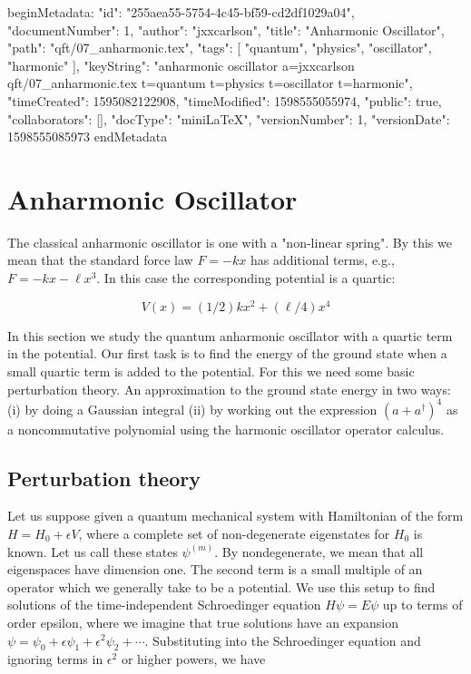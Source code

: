 beginMetadata:
{
    "id": "255aea55-5754-4c45-bf59-cd2df1029a04",
    "documentNumber": 1,
    "author": "jxxcarlson",
    "title": "Anharmonic Oscillator",
    "path": "qft/07_anharmonic.tex",
    "tags": [
        "quantum",
        "physics",
        "oscillator",
        "harmonic"
    ],
    "keyString": "anharmonic oscillator a=jxxcarlson qft/07_anharmonic.tex t=quantum t=physics t=oscillator t=harmonic",
    "timeCreated": 1595082122908,
    "timeModified": 1598555055974,
    "public": true,
    "collaborators": [],
    "docType": "miniLaTeX",
    "versionNumber": 1,
    "versionDate": 1598555085973
}
endMetadata
\begin{mathmacro}
\newcommand{\bra}[0]{\langle}
\newcommand{\ket}[0]{\rangle}
\newcommand{\WW}[0]{\mathbb{WW}}
\end{mathmacro}



\setcounter{section}{7}

\section{Anharmonic Oscillator}

\innertableofcontents

The classical anharmonic oscillator is one with a "non-linear spring". By this we mean that the standard force law $F = -kx$ has additional terms, e.g., $F = -kx - \ell x^3$.  In this case the corresponding potential is a quartic: 

\begin{equation}
V(x) = (1/2)kx^2 + (\ell/4)x^4
\end{equation}

In this section we study the quantum anharmonic oscillator with a quartic term in the potential.  Our first task is to find the energy of the ground state when a small quartic term is added to the potential.  For this we need some basic perturbation theory.  An approximation to the ground state energy in two ways: (i) by doing a Gaussian integral (ii) by working out the expression $(a + a^\dagger)^4$ as a noncommutative polynomial using the harmonic oscillator operator calculus.

\subsection{Perturbation theory}

Let us suppose given a quantum mechanical system with Hamiltonian of the form $H = H_0 + \epsilon V$, where a complete set of non-degenerate eigenstates for $H_0$ is known.  Let us call these states $\psi^{(m)}$. By nondegenerate, we mean that all eigenspaces have dimension one. The second term is a small multiple of an operator which we generally take to be a potential.  We use this setup to                                         find solutions of the time-independent Schroedinger equation $H\psi = E\psi$ up to terms of order epsilon, where we imagine that true solutions have an expansion $\psi = \psi_0 + \epsilon \psi_1 + \epsilon^2 \psi_2 + \cdots$.  Substituting into the Schroedinger equation and ignoring terms in $\epsilon^2$ or higher powers, we have

